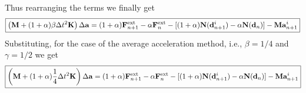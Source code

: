 Thus rearranging the terms we finally get 
\begin{align}
\boxed {
\left( {\bf M}
+
(1+\alpha)\beta \Delta t^2 {\bf K} \right){\Delta \bf a}
=
(1+\alpha){\bf F}^{\rm ext}_{n+1} - \alpha{\bf F}^{\rm ext}_n - [(1+\alpha){\bf N}({\bf d}^i_{n+1}) - \alpha {\bf N}({\bf d}_n)] - {\bf M} {\bf a}^{i}_{n+1}
}
\end{align}
Substituting, for the case of the average acceleration method, i.e., $\beta = 1/4$ and $\gamma = 1/2$ we get
\begin{align*}
\boxed {
\left( {\bf M}
+
(1+\alpha)\frac{1}{4} \Delta t^2 {\bf K} \right){\Delta \bf a}
=
(1+\alpha){\bf F}^{\rm ext}_{n+1} - \alpha{\bf F}^{\rm ext}_n - [(1+\alpha){\bf N}({\bf d}^i_{n+1}) - \alpha {\bf N}({\bf d}_n)] - {\bf M} {\bf a}^{i}_{n+1}
}
\end{align*}\newpage
